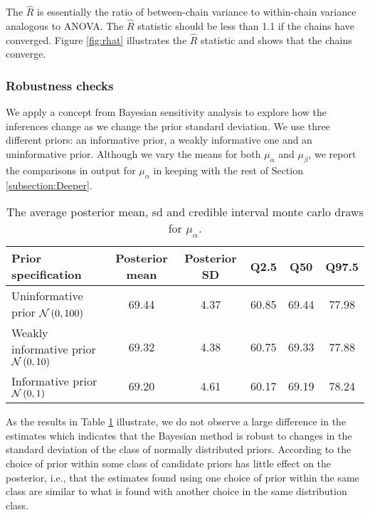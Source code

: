 The $\hat{R}$ is essentially the ratio of between-chain variance to within-chain variance analogous to ANOVA. The $\hat{R}$ statistic should be less than 1.1 if the chains have converged. Figure \ref{fig:rhat} illustrates the $\hat{R}$ statistic and shows that the chains converge.


\subsubsection{Robustness checks}

We apply a concept from Bayesian sensitivity analysis to explore how the inferences change as we change the prior standard deviation. We use three different priors: an informative prior, a weakly informative one and an uninformative prior. Although we vary the means for both $\mu_{\alpha}$ and $\mu_{\beta}$, we report the comparisons in output for $\mu_{\alpha}$ in keeping with the rest of Section \ref{subsection:Deeper}.

\begin{table}[!ht]
	\begin{center}
		\begin{tabular}{l | c c c c c}
			Prior specification & Posterior mean & Posterior SD & Q2.5 & Q50 & Q97.5\\
			\hline
			Uninformative prior $\mathcal{N}\left(0,100\right)$ & 69.44 & 4.37 & 60.85 & 69.44 & 77.98 \\
			Weakly informative prior $\mathcal{N}\left(0,10\right)$ & 69.32 &   4.38  & 60.75 &   69.33 &   77.88 \\
			Informative prior $\mathcal{N}\left(0,1\right)$ & 69.20 & 4.61 &  60.17 &  69.19  & 78.24
		\end{tabular}
	\end{center}
	\caption{The average posterior mean, sd and credible interval monte carlo draws for $\mu_{\alpha}$.}
	\label{tab:robustness}
\end{table} 
As the results in Table \ref{tab:robustness} illustrate, we do not observe a large difference in the estimates which indicates that the Bayesian method is robust to changes in the standard deviation of the class of normally distributed priors. According to \cite{edwards1963bayesian}  the choice of prior within some class of candidate priors has little effect on the posterior, i.e., that the estimates found using one choice of prior within the same class are similar to what is found with another choice in the same distribution class.  

